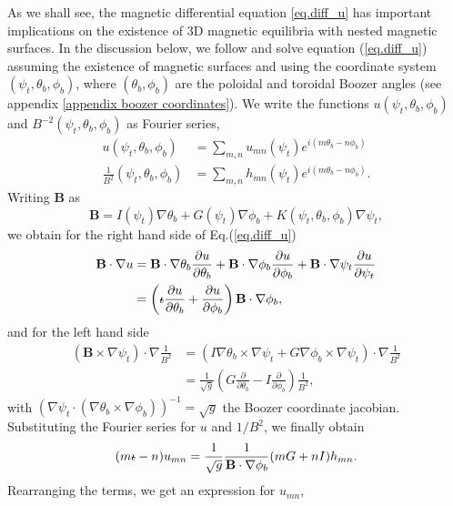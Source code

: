 \documentclass[my_thesis.tex]{subfiles}
\begin{document}
As we shall see, the magnetic differential equation \ref{eq.diff_u} has important implications on the existence of 3D magnetic equilibria with nested magnetic surfaces. In the discussion below, we follow \citet{Helander2014} and solve equation (\ref{eq.diff_u}) assuming the existence of magnetic surfaces and using the coordinate system $(\psi_t,\theta_b,\phi_b)$, where $(\theta_b,\phi_b)$ are the poloidal and toroidal Boozer angles (see appendix \ref{appendix boozer coordinates}). We write the functions $u(\psi_t,\theta_b,\phi_b)$ and $B^{-2}(\psi_t,\theta_b,\phi_b)$ as Fourier series,
\begin{align}
	u(\psi_t,\theta_b,\phi_b) &= \sum_{m,n} u_{mn}(\psi_t) e^{i(m\theta_b-n\phi_b)}\\
	\frac{1}{B^2}(\psi_t,\theta_b,\phi_b) &= \sum_{m,n} h_{mn}(\psi_t) e^{i(m\theta_b-n\phi_b)}.
\end{align}
Writing $\mathbf{B}$ as
\begin{equation}
	\mathbf{B} = I(\psi_t)\nabla\theta_b + G(\psi_t)\nabla\phi_b + K(\psi_t,\theta_b,\phi_b)\nabla\psi_t,
\end{equation}
we obtain for the right hand side of Eq.(\ref{eq.diff_u})
\begin{align}
	\mathbf{B}\cdot\nabla u &= \mathbf{B}\cdot\nabla\theta_b\frac{\partial u}{\partial \theta_b} + \mathbf{B}\cdot\nabla\phi_b\frac{\partial u}{\partial \phi_b} + \mathbf{B}\cdot\nabla\psi_t\frac{\partial u}{\partial \psi_t} \\
	&= \left(\text{$\iota\!\!$-} \frac{\partial u}{\partial \theta_b} + \frac{\partial u}{\partial \phi_b}\right)\mathbf{B}\cdot\nabla\phi_b,
\end{align}
and for the left hand side
\begin{align}
	\left(\mathbf{B}\times\nabla\psi_t\right)\cdot\nabla \frac{1}{B^2} &= \left(I\nabla\theta_b\times\nabla\psi_t + G\nabla\phi_b\times\nabla\psi_t\right)\cdot\nabla\frac{1}{B^2}\\
	&= \frac{1}{\sqrt{g}}\left(G\frac{\partial}{\partial\theta_b} - I \frac{\partial}{\partial \phi_b}\right)\frac{1}{B^2},
\end{align}
with $(\nabla\psi_t\cdot(\nabla\theta_b\times\nabla\phi_b))^{-1} = \sqrt{g}$ the Boozer coordinate jacobian. Substituting the Fourier series for $u$ and $1/B^2$, we finally obtain
\begin{equation}
	(m\text{$\iota\!\!$-} - n)u_{mn} = \frac{1}{\sqrt{g}}\frac{1}{\mathbf{B}\cdot\nabla\phi_b}(mG + nI)h_{mn}.
\end{equation}
Rearranging the terms, we get an expression for $u_{mn}$,
\end{document}
